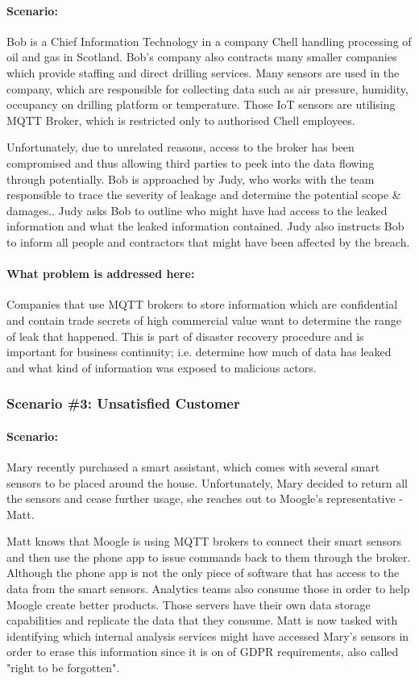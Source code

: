 \paragraph{\textbf{Scenario:}}
Bob is a Chief Information Technology in a company Chell handling processing of oil and gas in Scotland. Bob's company also contracts many smaller companies which provide staffing and direct drilling services. Many sensors are used in the company, which are responsible for collecting data such as air pressure, humidity, occupancy on drilling platform or temperature. Those IoT sensors are utilising MQTT Broker, which is restricted only to authorised Chell employees.

Unfortunately, due to unrelated reasons, access to the broker has been compromised and thus allowing third parties to peek into the data flowing through potentially. Bob is approached by Judy, who works with the team responsible to trace the severity of leakage and determine the potential scope \& damages.. Judy asks Bob to outline who might have had access to the leaked information and what the leaked information contained. Judy also instructs Bob to inform all people and contractors that might have been affected by the breach.
\paragraph{\textbf{What problem is addressed here:}}
Companies that use MQTT brokers to store information which are confidential and contain trade secrets of high commercial value want to determine the range of leak that happened. This is part of disaster recovery procedure and is important for business continuity; i.e. determine how much of data has leaked and what kind of information was exposed to malicious actors. 
\\
\subsubsection{Scenario \#3: Unsatisfied Customer}
\paragraph{\textbf{Scenario:}}
Mary recently purchased a smart assistant, which comes with several smart sensors to be placed around the house. Unfortunately, Mary decided to return all the sensors and cease further usage, she reaches out to Moogle's representative - Matt.

Matt knows that Moogle is using MQTT brokers to connect their smart sensors and then use the phone app to issue commands back to them through the broker. Although the phone app is not the only piece of software that has access to the data from the smart sensors. Analytics teams also consume those in order to help Moogle create better products. Those servers have their own data storage capabilities and replicate the data that they consume. Matt is now tasked with identifying which internal analysis services might have accessed Mary's sensors in order to erase this information since it is on of GDPR requirements, also called "right to be forgotten".
